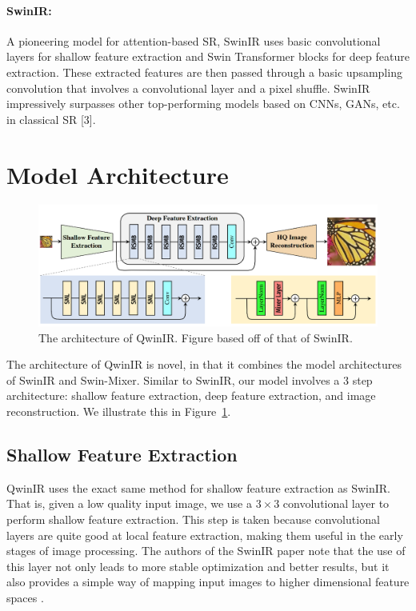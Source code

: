 \documentclass{article}
\begin{document}
\paragraph{SwinIR:} A pioneering model for attention-based SR, SwinIR uses basic convolutional layers for shallow feature extraction and Swin Transformer blocks for deep feature extraction. These extracted features are then passed through a basic upsampling convolution that involves a convolutional layer and a pixel shuffle. SwinIR impressively surpasses other top-performing models based on CNNs, GANs, etc. in classical SR [3].

\section{Model Architecture}

\begin{figure}\label{fig:architecture}
    \centering
    \includegraphics[width=\textwidth]{qwinir-architecture.png}
    \caption{The architecture of QwinIR. Figure based off of that of SwinIR.}
\end{figure}

The architecture of QwinIR is novel, in that it combines the model architectures of SwinIR and Swin-Mixer. Similar to SwinIR, our model involves a 3 step architecture: shallow feature extraction, deep feature extraction, and image reconstruction. We illustrate this in Figure~\ref{fig:architecture}.

\subsection{Shallow Feature Extraction}

QwinIR uses the exact same method for shallow feature extraction as SwinIR. That is, given a low quality input image, we use a $3 \times 3$ convolutional layer to perform shallow feature extraction. This step is taken because convolutional layers are quite good at local feature extraction, making them useful in the early stages of image processing. The authors of the SwinIR paper note that the use of this layer not only leads to more stable optimization and better results, but it also provides a simple way of mapping input images to higher dimensional feature spaces \citep{liang2021swinir}.
\end{document}
